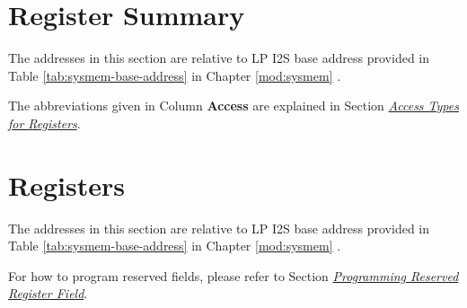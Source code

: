 \documentclass[main\_\_EN.tex]{subfiles}
\begin{document}
\newpage
\hypertarget{lpi2s-reg-summ}{}
\section{Register Summary}
\label{sec:lpi2s-reg-summ}

The addresses in this section are relative to LP I2S base address provided in Table \ref{tab:sysmem-base-address} in Chapter \ref{mod:sysmem} \textit{}.

The abbreviations given in Column \textbf{Access} are explained in Section \hyperref[glossary-access-types]{\textit{Access Types for Registers}}.





\newpage
\section{Registers}

The addresses in this section are relative to LP I2S base address provided in Table \ref{tab:sysmem-base-address} in Chapter \ref{mod:sysmem} \textit{}.

For how to program reserved fields, please refer to Section \hyperref[programming-reserved-field]{\textit{Programming Reserved Register Field}}.


\end{document}
